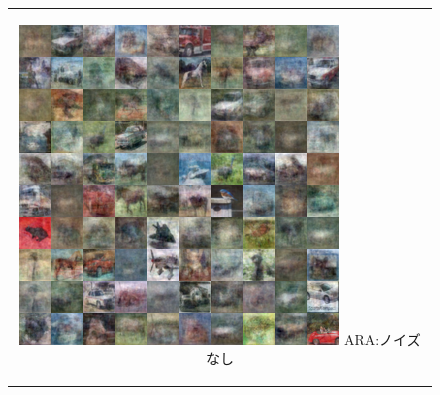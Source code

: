 \documentclass[12pt]{jsarticle}
\begin{document}
\begin{figure}[h]
\begin{center}
\begin{tabular}{c}
      \begin{minipage}{0.33\hsize}
        \begin{center}
          \includegraphics[clip, width=\linewidth]{train_ln499_mode_ARA_ln_500-dn_100_tn_100_noise_0.png}
          \hspace{0.2cm} ARA:ノイズなし
        \end{center}
      \end{minipage}


\end{tabular}
\end{center}
\end{figure}
\end{document}
